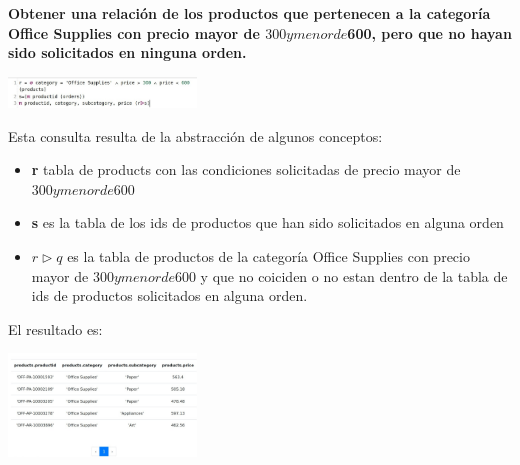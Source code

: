 \textbf{Obtener una relación de los productos que pertenecen a la categoría Office Supplies con precio mayor de $300 y menor de $600, pero que no hayan sido solicitados en ninguna orden.} \vspace{.3cm}

\begin{center}
    \includegraphics[width=5cm]{resources/pregunta2/2.2.1}
\end{center}

Esta consulta resulta de la abstracción de algunos conceptos:
\begin{itemize}
    \item \textbf{r} tabla de products con las condiciones solicitadas de precio mayor de $300 y menor de $600
    \item  \textbf{s} es la tabla de los ids de productos que han sido solicitados en alguna orden
    \item  \textbf{$r \vartriangleright q$} es la tabla de productos de la categoría Office Supplies con precio mayor de $300 y menor de $600 y que no coiciden o no estan dentro de la tabla de ids de productos solicitados en alguna orden.
\end{itemize}

El resultado es:

\begin{center}
    \includegraphics[width=5cm]{resources/pregunta2/2.2.2}
\end{center}


